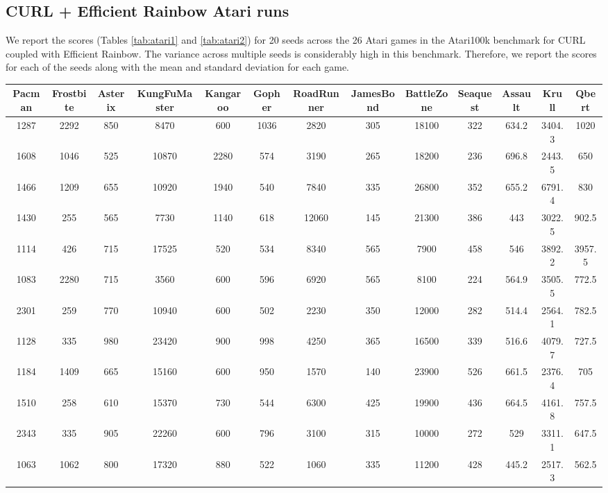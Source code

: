 \subsection{CURL + Efficient Rainbow Atari runs}

We report the scores (Tables \ref{tab:atari1} and \ref{tab:atari2}) for 20 seeds across the 26 Atari games in the Atari100k benchmark for CURL coupled with Efficient Rainbow. The variance across multiple seeds is considerably high in this benchmark. Therefore, we report the scores for each of the seeds along with the mean and standard deviation for each game. 

\begin{table}[!ht]%
\centering
\small
\setlength\tabcolsep{2.5pt}
\begin{tabular}{c|c|c|c|c|c|c|c|c|c|c|c|c}
\hline
Pacman &	Frostbite &	Asterix  &	KungFuMaster &	Kangaroo &	Gopher &	RoadRunner &	JamesBond &	BattleZone &	Seaquest &	Assault &	Krull &	Qbert			 \\
\hline
1287 &	2292 &	850 &	8470 &	600 &	1036 &	2820 &	305 &	18100 &	322 &	634.2 &	3404.3 &	1020 \\
1608 &	1046 &	525 &	10870 &	2280 &	574 &	3190 &	265 &	18200 &	236 &	696.8 &	2443.5 &	650  \\
1466 &	1209 &	655 &	10920 &	1940 &	540 &	7840 &	335 &	26800 &	352 &	655.2 &	6791.4 &	830  \\
1430 &	255 &	565 &	7730 &	1140 &	618 &	12060 &	145 &	21300 &	386 &	443 &	3022.5 &	902.5  \\
1114 &	426 &	715 &	17525 &	520 &	534 &	8340 &	565 &	7900 &	458 &	546 &	3892.2 &	3957.5  \\
1083 &	2280 &	715 &	3560 &	600 &	596 &	6920 &	565 &	8100 &	224 &	564.9 &	3505.5 &	772.5 \\
2301 &	259 &	770 &	10940 &	600 &	502 &	2230 &	350 &	12000 &	282 &	514.4 &	2564.1 &	782.5  \\
1128 &	335 &	980 &	23420 &	900 &	998 &	4250 &	365 &	16500 &	339 &	516.6 &	4079.7 &	727.5  \\
1184 &	1409 &	665 &	15160 &	600 &	950 &	1570 &	140 &	23900 &	526 &	661.5 &	2376.4 &	705 \\
1510 &	258 &	610 &	15370 &	730 &	544 &	6300 &	425 &	19900 &	436 &	664.5 &	4161.8 &	757.5  \\
2343 &	335 &	905 &	22260 &	600 &	796 &	3100 &	315 &	10000 &	272 &	529 &	3311.1 &	647.5  \\
1063 &	1062 &	800 &	17320 &	880 &	522 &	1060 &	335 &	11200 &	428 &	445.2 &	2517.3 &	562.5  \\

\end{tabular}
\end{table}
